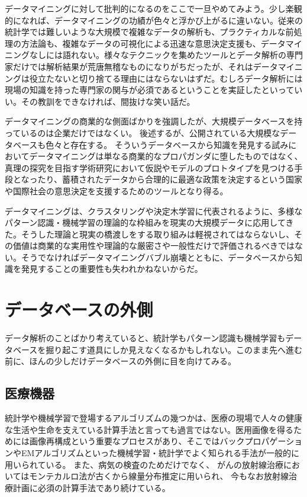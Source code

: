 データマイニングに対して批判的になるのをここで一旦やめてみよう。少し楽観的になれば、データマイニングの功績が色々と浮かび上がるに違いない。従来の統計学では難しいような大規模で複雑なデータの解析も、プラクティカルな前処理の方法論も、複雑なデータの可視化による迅速な意思決定支援も、データマイニングなしには語れない。様々なテクニックを集めたツールとデータ解析の専門家だけでは解析結果が荒唐無稽なものになりがちだったが、それはデータマイニングは役立たないと切り捨てる理由にはならないはずだ。むしろデータ解析には現場の知識を持った専門家の関与が必須であるということを実証したといっていい。その教訓をできなければ、間抜けな笑い話だ。

データマイニングの商業的な側面ばかりを強調したが、大規模データベースを持っているのは企業だけではなくい。
後述するが、公開されている大規模なデータベースも色々と存在する。
そういうデータベースから知識を発見する試みにおいてデータマイニングは単なる商業的なプロパガンダに堕したものではなく、真理の探究を目指す学術研究において仮説やモデルのプロトタイプを見つける手段となったり、蓄積されたデータから合理的に最適な政策を決定するという国家や国際社会の意思決定を支援するためのツールとなり得る。

データマイニングは、クラスタリングや決定木学習に代表されるように、多様なパターン認識・機械学習の理論的な枠組みを現実の大規模データに応用してきた。そうした理論と現実の橋渡しをする取り組みは軽視されてはならないし、その価値は商業的な実用性や理論的な厳密さや一般性だけで評価されるべきではない。そうでなければデータマイニングバブル崩壊とともに、データベースから知識を発見することの重要性も失われかねないからだ。

\section{データベースの外側}
データ解析のことばかり考えていると、統計学もパターン認識も機械学習もデータベースを掘り起こす道具にしか見えなくなるかもしれない。このまま先へ進む前に、ほんの少しだけデータベースの外側に目を向けてみる。
\subsection{医療機器}
統計学や機械学習で登場するアルゴリズムの幾つかは、医療の現場で人々の健康な生活や生命を支えている計算手法と言っても過言ではない。医用画像を得るためには画像再構成という重要なプロセスがあり、そこではバックプロパゲーションやEMアルゴリズムといった機械学習・統計学でよく知られる手法が一般的に用いられている。
また、病気の検査のためだけでなく、
がんの放射線治療においてはモンテカルロ法が古くから線量分布推定に用いられ、
今もなお放射線治療計画に必須の計算手法であり続けている。


